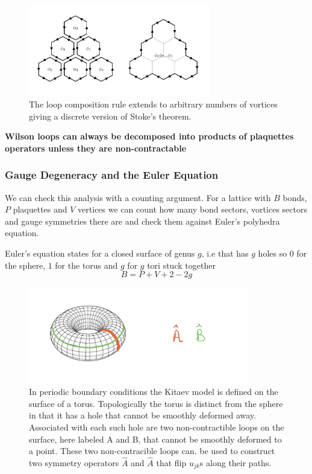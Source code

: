 \begin{figure}
\hypertarget{fig:stokes_theorem}{%
\centering
\includegraphics[width=0.71\textwidth,height=\textheight]{figure_code/amk_chapter/stokes_theorem/stokes_theorem.pdf}
\caption{The loop composition rule extends to arbitrary numbers of
vortices giving a discrete version of Stoke's
theorem.}\label{fig:stokes_theorem}
}
\end{figure}

\textbf{Wilson loops can always be decomposed into products of
plaquettes operators unless they are non-contractable}

\hypertarget{gauge-degeneracy-and-the-euler-equation}{%
\subsubsection{Gauge Degeneracy and the Euler
Equation}\label{gauge-degeneracy-and-the-euler-equation}}

We can check this analysis with a counting argument. For a lattice with
\(B\) bonds, \(P\) plaquettes and \(V\) vertices we can count how many
bond sectors, vortices sectors and gauge symmetries there are and check
them against Euler's polyhedra equation.

Euler's equation states for a closed surface of genus \(g\), i.e that
has \(g\) holes so \(0\) for the sphere, \(1\) for the torus and \(g\)
for \(g\) tori stuck together \[B = P + V + 2 - 2g\]

\begin{figure}
\hypertarget{fig:torus}{%
\centering
\includegraphics[width=0.86\textwidth,height=\textheight]{figs/torus.jpeg}
\caption{In periodic boundary conditions the Kitaev model is defined on
the surface of a torus. Topologically the torus is distinct from the
sphere in that it has a hole that cannot be smoothly deformed away.
Associated with each such hole are two non-contractible loops on the
surface, here labeled A and B, that cannot be smoothly deformed to a
point. These two non-contracible loops can. be used to construct two
symmetry operators \(\hat{A}\) and \(\hat{A}\) that flip \(u_{jk}\)s
along their paths.}\label{fig:torus}
}
\end{figure}

